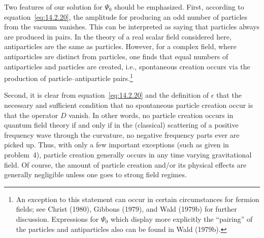 Two features of our solution for \(\Psi_0\) should be emphasized. First, according
to equation~\eqref{eq:14.2.20}, the amplitude for producing an odd number of
particles from the vacuum vanishes. This can be interpreted as saying that particles
always are produced in pairs. In the theory of a real scalar field considered here,
antiparticles are the same as particles. However, for a complex field, where
antiparticles are distinct from particles, one finds that equal numbers of antiparticles
and particles are created, i.e., spontaneous creation occurs via the production of
particle--antiparticle pairs.\footnote{An exception to this statement can occur in
certain circumstances for fermion fields; see Christ (1980), Gibbons (1979), and
Wald (1979b) for further discussion. Expressions for \(\Psi_0\) which display more
explicitly the ``pairing'' of the particles and antiparticles also can be found in Wald
(1979b).}

Second, it is clear from equation~\eqref{eq:14.2.20} and the definition of
\(\epsilon\) that the necessary and sufficient condition that no spontaneous particle
creation occur is that the operator \(D\) vanish. In other words, no particle creation
occurs in quantum field theory if and only if in the (classical) scattering of a positive
frequency wave through the curvature, no negative frequency parts ever are picked
up. Thus, with only a few important exceptions (such as given in problem~4),
particle creation generally occurs in any time varying gravitational field. Of course,
the amount of particle creation and/or its physical effects are generally negligible
unless one goes to strong field regimes.

